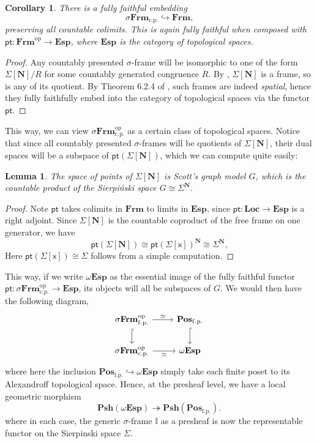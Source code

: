 \documentclass[a4paper,12pt]{amsart}
\newtheorem{lemma}[theorem]{Lemma}
\newtheorem{corollary}[theorem]{Corollary}
\theoremstyle{definition}
\newcommand{\mb}[1]{\mathbf{#1}}
\newcommand{\mbb}[1]{\mathbb{#1}}
\newcommand{\I}{\mbb I}
\newcommand{\mr}[1]{\mathrm{#1}}
\newcommand{\ms}[1]{\mathsf{#1}}
\newcommand{\Pos}{\mb{Pos}}
\newcommand{\psh}{\mb{Psh}}
\newcommand{\op}{^{\mathrm{op}}}
\newcommand{\surj}{\twoheadrightarrow}
\newcommand{\hook}{\hookrightarrow}
\newcommand{\fp}{_{\mr{f.p.}}}
\newcommand{\cp}{_{\mr{c.p.}}}
\newcommand{\N}{\mb N}
\newcommand{\pt}{\ms{pt}}
\newcommand{\sFrm}{\sigma\mb{Frm}}
\newcommand{\Frm}{\mb{Frm}}
\newcommand{\Loc}{\mb{Loc}}
\newcommand{\Topp}{\mb{Esp}}
\newcommand{\wTop}{\omega\mb{Esp}}
\begin{document}

\begin{corollary}\label{cor:dualsframe}
  There is a fully faithful embedding
  \[ \sFrm\cp \hook \Frm\text{,} \]
  preserving all countable colimits. This is again fully faithful when composed with $\ms{pt} \colon \Frm\op \to \Topp$, where $\Topp$ is the category of topological spaces.
\end{corollary}
\begin{proof}
  Any countably presented $\sigma$-frame will be isomorphic to one of the form $\Sigma[\N]/R$ for some countably generated congruence $R$. By , $\Sigma[\N]$ is a frame, so is any of its quotient. By Theorem 6.2.4 of \citet{makkai2006first}, such frames are indeed \emph{spatial}, hence they fully faithfully embed into the category of topological spaces via the functor $\pt$.
\end{proof}

This way, we can view $\sFrm\cp\op$ as a certain class of topological spaces. Notice that since all countably presented $\sigma$-frames will be quotients of $\Sigma[\N]$, their dual spaces will be a subspace of $\pt(\Sigma[\N])$, which we can compute quite easily:

\begin{lemma}
  The space of points of $\Sigma[\N]$ is Scott's graph model $G$, which is the countable product of the Sierpi\'nski space $G \cong \Sigma^\N$.
\end{lemma}
\begin{proof}
  Note $\pt$ takes colimits in $\Frm$ to limits in $\Topp$, since $\pt \colon \Loc \to \Topp$ is a right adjoint. Since $\Sigma[\N]$ is the countable coproduct of the free frame on one generator, we have
  \[ \pt(\Sigma[\N]) \cong \pt(\Sigma[\ms{x}])^\N \cong \Sigma^\N\text{,} \]
  Here $\pt(\Sigma[\ms{x}]) \cong \Sigma$ follows from a simple computation.
\end{proof}

This way, if we write $\wTop$ as the essential image of the fully faithful functor $\pt \colon \sFrm\cp\op \to \Topp$, its objects will all be subspaces of $G$. We would then have the following diagram,
\[
\begin{tikzcd}
  \sFrm\fp\op \ar[d, hook] \ar[r, "\simeq"] & \Pos\fp \ar[d, hook] \\
  \sFrm\cp\op \ar[r, "\simeq"'] & \wTop
\end{tikzcd}
\]
where here the inclusion $\Pos\fp \hook \wTop$ simply take each finite poset to its Alexandroff topological space. Hence, at the presheaf level, we have a local geometric morphism
\[ \psh(\wTop) \surj \psh(\Pos\fp)\text{.} \]
where in each case, the generic $\sigma$-frame $\I$ as a presheaf is now the representable functor on the Sierpinski space $\Sigma$. 
\end{document}
